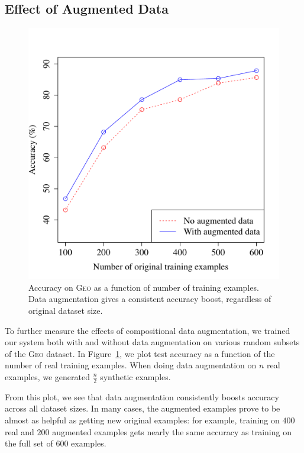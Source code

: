 \documentclass[11pt,letterpaper]{article}
\newcommand{\geo}{\textsc{Geo}\xspace}
\newcommand\rj[1]{}
\begin{document}
\subsection{Effect of Augmented Data}
\begin{figure}[t] 
\small
\begin{center} 
  \includegraphics[scale=0.4]{fig-geo-augment.pdf}
\end{center} 
\caption{Accuracy on \geo as a function of number of training examples.
  Data augmentation gives a consistent accuracy boost,
regardless of original dataset size.}
\label{fig:geo-augment}
\end{figure}
\rj{Rewrote quite a bit here, as I think we maybe shouldn't
  focus so much on directly comparing the value of
real and augmented examples, at least in this subsection}

To further measure the effects of compositional data augmentation,
we trained our system both with and without data augmentation
on various random subsets of the \geo dataset.
In Figure~\ref{fig:geo-augment}, we plot test accuracy as a function of
the number of real training examples.
When doing data augmentation on $n$ real examples,
we generated $\frac{n}2$ synthetic examples.

From this plot, we see that data augmentation consistently boosts accuracy
across all dataset sizes.
In many cases, the augmented examples prove to be
almost as helpful as getting new original examples:
for example, training on $400$ real and $200$ augmented examples
gets nearly the same accuracy as training on the full set of $600$ examples.
\end{document}
